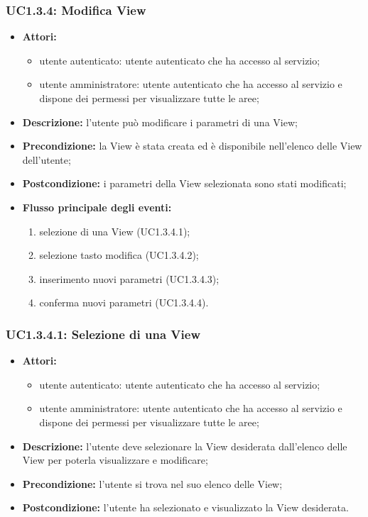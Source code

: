 \subsubsection{UC1.3.4: Modifica View}

\begin{itemize}
   	\item \textbf{Attori:}
    \begin{itemize}
    	\item utente autenticato: utente autenticato che ha accesso al servizio;
    	\item utente amministratore: utente autenticato che ha accesso al servizio e dispone dei permessi per visualizzare tutte le aree;
	\end{itemize}
    \item \textbf{Descrizione:} l'utente può modificare i parametri di una View;
    \item \textbf{Precondizione:} la View è stata creata ed è disponibile nell'elenco delle View dell'utente;
    \item \textbf{Postcondizione:} i parametri della View selezionata sono stati modificati;
	\item \textbf{Flusso principale degli eventi:}
    \begin{enumerate}
        \item selezione di una View (UC1.3.4.1);
        \item selezione tasto modifica (UC1.3.4.2);
        \item inserimento nuovi parametri (UC1.3.4.3);
        \item conferma nuovi parametri (UC1.3.4.4).
    \end{enumerate}
\end{itemize}

\subsubsection{UC1.3.4.1: Selezione di una View}

\begin{itemize}
    \item \textbf{Attori:}
    \begin{itemize}
    	\item utente autenticato: utente autenticato che ha accesso al servizio;
    	\item utente amministratore: utente autenticato che ha accesso al servizio e dispone dei permessi per visualizzare tutte le aree;
	\end{itemize}
    \item \textbf{Descrizione:} l'utente deve selezionare la View desiderata dall'elenco delle View per poterla visualizzare e modificare;
    \item \textbf{Precondizione:} l'utente si trova nel suo elenco delle View;
    \item \textbf{Postcondizione:} l'utente ha selezionato e visualizzato la View desiderata.
\end{itemize}

